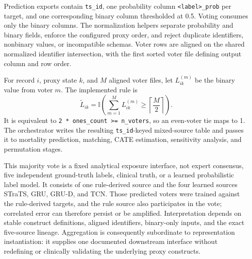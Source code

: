 Prediction exports contain \texttt{ts\_id}, one probability column \texttt{<label>\_prob} per target, and one corresponding binary column thresholded at 0.5.  Voting consumes only the binary columns.  The normalization helpers separate probability and binary fields, enforce the configured proxy order, and reject duplicate identifiers, nonbinary values, or incompatible schemas.  Voter rows are aligned on the shared normalized identifier intersection, with the first sorted voter file defining output column and row order.

For record $i$, proxy state $k$, and $M$ aligned voter files, let $L_{ik}^{(m)}$ be the binary value from voter $m$.  The implemented rule is
\[
\widetilde{L}_{ik}
=
\mathbb{I}
\left(
\sum_{m=1}^{M} L_{ik}^{(m)}
\geq
\left\lceil \frac{M}{2}\right\rceil
\right).
\]
It is equivalent to \texttt{2 * ones\_count >= n\_voters}, so an even-voter tie maps to 1.  The orchestrator writes the resulting \texttt{ts\_id}-keyed mixed-source table and passes it to mortality prediction, matching, CATE estimation, sensitivity analysis, and permutation stages.

This majority vote is a fixed analytical exposure interface, not expert consensus, five independent ground-truth labels, clinical truth, or a learned probabilistic label model.  It consists of one rule-derived source and the four learned sources STraTS, GRU, GRU-D, and TCN.  Those predicted voters were trained against the rule-derived targets, and the rule source also participates in the vote; correlated error can therefore persist or be amplified.  Interpretation depends on stable construct definitions, aligned identifiers, binary-only inputs, and the exact five-source lineage.  Aggregation is consequently subordinate to representation instantiation: it supplies one documented downstream interface without redefining or clinically validating the underlying proxy constructs.
